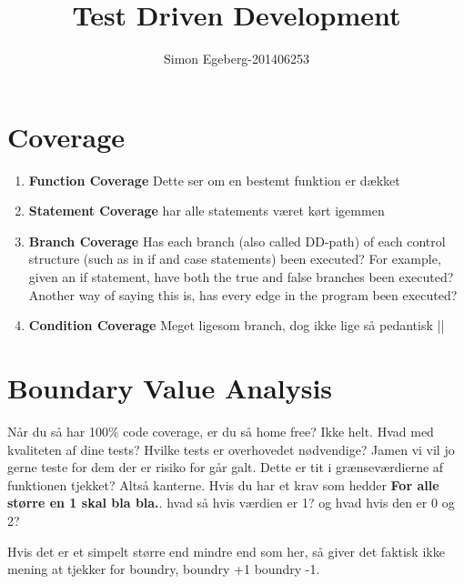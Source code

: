 \documentclass{article}
\title{Test Driven Development}
\author{Simon Egeberg-201406253}
\begin{document}
\maketitle
\section{Coverage}
\begin{enumerate}
	\item \textbf{Function Coverage} Dette ser om en bestemt funktion er dækket
	\item \textbf{Statement Coverage} har alle statements været kørt igemmen
	\item \textbf{Branch Coverage} Has each branch (also called DD-path) of each control structure (such as in if and case statements) been executed? For example, given an if statement, have both the true and false branches been executed? Another way of saying this is, has every edge in the program been executed?
	\item \textbf{Condition Coverage} Meget ligesom branch, dog ikke lige så pedantisk ||
\end{enumerate}
\section{Boundary Value Analysis}
Når du så har 100\% code coverage, er du så home free? Ikke helt. Hvad med kvaliteten af dine tests? Hvilke tests er overhovedet nødvendige? Jamen vi vil jo gerne teste for dem der er risiko for går galt. Dette er tit i grænseværdierne af funktionen tjekket? Altså kanterne. Hvis du har et krav som hedder \textbf{For alle større en 1 skal bla bla.}. hvad så hvis værdien er 1? og hvad hvis den er 0 og 2? 

Hvis det er et simpelt større end mindre end som her, så giver det faktisk ikke mening at tjekker for boundry, boundry +1 boundry -1. 
\end{document}

